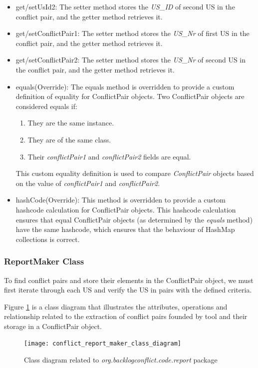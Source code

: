 \begin{itemize}
	\item get/setUsId2: The setter method stores the \textit{US\_ID} of second US in the conflict pair, and the getter method retrieves it.
	
	\item get/setConflictPair1: The setter method stores the \textit{US\_Nr} of first US in the conflict pair, and the getter method retrieves it.
	
	\item get/setConflictPair2: The setter method stores the \textit{US\_Nr} of second US in the conflict pair, and the getter method retrieves it.
	
	\item equals(Override): The equals method is overridden to provide a custom definition of equality for ConflictPair objects. Two ConflictPair objects are considered equals if:
	\begin{enumerate}
		\item They are the same instance.
		
		\item They are of the same class.
		
		\item Their \textit{conflictPair1} and  \textit{conflictPair2} fields are equal.
		
	\end{enumerate}
	This custom equality definition is used to compare \textit{ConflictPair} objects based on the value of \textit{conflictPair1} and \textit{conflictPair2}.

	\item hashCode(Override): This method is overridden to provide a custom hashcode calculation for ConflictPair objects. This hashcode calculation ensures that equal ConflictPair objects (as determined by the \textit{equals} method) have the same hashcode, which ensures that the behaviour of HashMap collections is correct.
	
\end{itemize}

\subsubsection*{ReportMaker Class}
To find conflict pairs and store their elements in the ConflictPair object, we must first iterate through each US and verify the US in pairs with the defined criteria. 

Figure \ref{fig:conflict_report_maker_class_diagram} is a class diagram that illustrates the attributes, operations and relationship related to the extraction of conflict pairs founded by tool and their storage in a ConflictPair object.
\begin{figure}[h]
	\centering
	\texttt{[image: conflict\_report\_maker\_class\_diagram]}
	\caption{Class diagram related to \textit{org.backlogconflict.code.report} package }\label{fig:conflict_report_maker_class_diagram}
\end{figure} 


